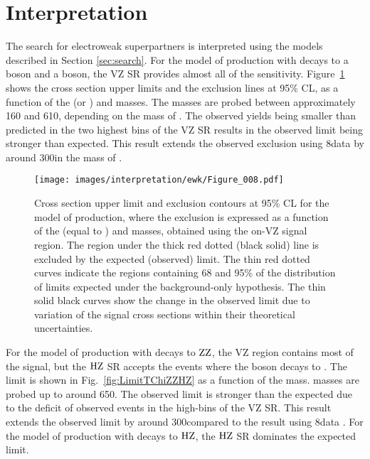 \section{Interpretation}
\noindent
\justify
The search for electroweak superpartners is interpreted using the models described in Section \ref{sec:search}.
For the model of \firstcharg\secondchi production with decays to a \PZ boson and a \PW boson, the VZ SR provides almost all of the sensitivity.
Figure~\ref{fig:LimitTChiWZ} shows the cross section upper limits and the exclusion lines at 95\% CL, as a function of the \firstcharg (or \secondchi) and \firstchi masses.
The \firstcharg masses are probed between approximately 160 and 610\GeV, depending on the mass of \firstchi.
The observed yields being smaller than predicted in the two highest \ptmiss bins of the VZ SR results in the observed limit being stronger than expected.
This result extends the observed exclusion using 8\TeV data by around 300\GeV in the mass of \firstcharg \cite{Khachatryan:2015lwa}.
\begin{figure}[hb]
 \centering
   \texttt{[image: images/interpretation/ewk/Figure\_008.pdf]}
   \caption{\label{fig:LimitTChiWZ}
Cross section upper limit and exclusion contours at 95\% CL for the model of \firstcharg\secondchi production, where the exclusion is expressed as a function of the \firstcharg (equal to \secondchi) and \firstchi masses, obtained using the on-\PZ VZ signal region.
The region under the thick red dotted (black solid) line is excluded by the expected (observed) limit.
The thin red dotted curves indicate the regions containing 68 and 95\% of the distribution of limits expected under the background-only hypothesis.
The thin solid black curves show the change in the observed limit due to variation of the signal cross sections within their theoretical uncertainties.}
\end{figure}
\newpara
\noindent\justify
For the model of \firstchi\firstchi production with decays to $\mathrm{Z}\mathrm{Z}$, the VZ region contains most of the signal, but the $\mathrm{H}\mathrm{Z}$ SR accepts the events where the \PZ boson decays to \bbbar.
The limit is shown in Fig.~\ref{fig:LimitTChiZZHZ} as a function of the \firstchi mass.  
\firstchi masses are probed up to around 650\GeV.
The observed limit is stronger than the expected due to the deficit of observed events in the high-\ptmiss bins of the VZ SR.
This result extends the observed limit by around 300\GeV compared to the result using 8\TeV data \cite{Khachatryan:2015lwa}.
For the model of \firstchi\firstchi production with decays to $\mathrm{H}\mathrm{Z}$, the $\mathrm{H}\mathrm{Z}$ SR dominates the expected limit.

